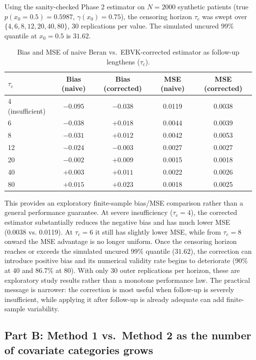 \documentclass[11pt]{article}
\begin{document}
Using the sanity-checked Phase 2 estimator on $N=2000$ synthetic patients (true
$p(x_0=0.5) = 0.5987$, $\gamma(x_0)=0.75$), the censoring horizon $\tau_c$ was
swept over $\{4, 6, 8, 12, 20, 40, 80\}$, 30 replications per value. The
simulated uncured 99\% quantile at $x_0=0.5$ is $31.62$.

\begin{table}[h]
\centering
\caption{Bias and MSE of naive Beran vs.\ EBVK-corrected estimator as follow-up lengthens ($\tau_c$).}
\begin{tabular}{lcccc}
\toprule
$\tau_c$ & Bias (naive) & Bias (corrected) & MSE (naive) & MSE (corrected) \\
\midrule
4 (insufficient) & $-0.095$ & $-0.038$ & 0.0119 & 0.0038 \\
6 & $-0.038$ & $+0.018$ & 0.0044 & 0.0039 \\
8 & $-0.031$ & $+0.012$ & 0.0042 & 0.0053 \\
12 & $-0.024$ & $-0.003$ & 0.0027 & 0.0027 \\
20 & $-0.002$ & $+0.009$ & 0.0015 & 0.0018 \\
40 & $+0.003$ & $+0.011$ & 0.0022 & 0.0026 \\
80 & $+0.015$ & $+0.023$ & 0.0018 & 0.0025 \\
\bottomrule
\end{tabular}
\end{table}

This provides an exploratory finite-sample bias/MSE comparison rather than a
general performance guarantee. At severe insufficiency ($\tau_c=4$), the corrected
estimator substantially reduces the negative bias and has much lower MSE (0.0038 vs.
0.0119). At $\tau_c=6$ it still has slightly lower MSE, while from $\tau_c=8$ onward
the MSE advantage is no longer uniform. Once the censoring horizon reaches or
exceeds the simulated uncured 99\% quantile ($31.62$), the correction can introduce
positive bias and its numerical validity rate begins to deteriorate (90\% at $40$
and 86.7\% at $80$). With only 30 outer replications per horizon, these are
exploratory study results rather than a monotone performance law. The practical
message is narrower: the correction is most useful when follow-up is severely
insufficient, while applying it after follow-up is already adequate can add
finite-sample variability.

\subsection{Part B: Method 1 vs.\ Method 2 as the number of covariate categories grows}
\end{document}
